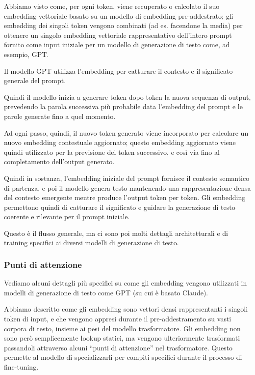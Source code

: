         Abbiamo visto come, per ogni token, viene recuperato o calcolato il suo embedding vettoriale basato su un modello di embedding pre-addestrato; gli embedding dei singoli token vengono combinati (ad es. facendone la media) per ottenere un singolo embedding vettoriale rappresentativo dell'intero prompt fornito come input iniziale per un modello di generazione di testo come, ad esempio, GPT.
        
        Il modello GPT utilizza l'embedding per catturare il contesto e il significato generale del prompt.
        
        Quindi il modello inizia a generare token dopo token la nuova sequenza di output, prevedendo la parola successiva più probabile data l'embedding del prompt e le parole generate fino a quel momento.
        
        Ad ogni passo, quindi, il nuovo token generato viene incorporato per calcolare un nuovo embedding contestuale aggiornato; questo embedding aggiornato viene quindi utilizzato per la previsione del token successivo, e così via fino al completamento dell'output generato.
        
        Quindi in sostanza, l'embedding iniziale del prompt fornisce il contesto semantico di partenza, e poi il modello genera testo mantenendo una rappresentazione densa del contesto emergente mentre produce l'output token per token. Gli embedding permettono quindi di catturare il significato e guidare la generazione di testo coerente e rilevante per il prompt iniziale.
        
        Questo è il flusso generale, ma ci sono poi molti dettagli architetturali e di training specifici ai diversi modelli di generazione di testo.
    
        \subsubsection{Punti di attenzione}
            Vediamo alcuni dettagli più specifici su come gli embedding vengono utilizzati in modelli di generazione di testo come GPT (su cui è basato Claude).

            Abbiamo descritto come gli embedding sono vettori densi rappresentanti i singoli token di input, e che vengono appresi durante il pre-addestramento su vasti corpora di testo, insieme ai pesi del modello trasformatore. Gli embedding non sono però semplicemente lookup statici, ma vengono ulteriormente trasformati passandoli attraverso alcuni “punti di attenzione” nel trasformatore. Questo permette al modello di specializzarli per compiti specifici durante il processo di fine-tuning.
            
